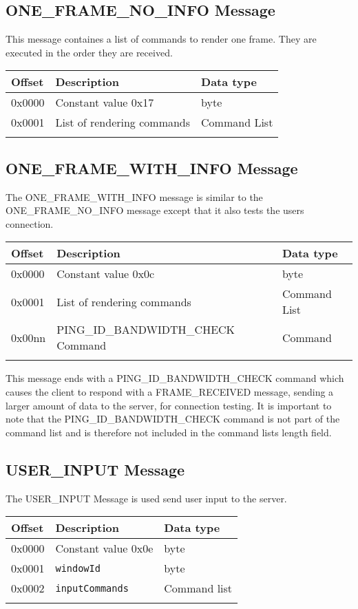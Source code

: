 \documentclass{article}
\newcommand{\field}[1]{\textcolor{fieldColor}{\texttt{#1}}}
\newenvironment{bytelisting}
{\ttfamily \begin{center} \begin{tabular}{l l l} Offset & Description & Data type \\ \hline}
{\normalfont \end{tabular} \end{center}}
\begin{document}
\subsection{ONE\_FRAME\_NO\_INFO Message}
This message containes a list of commands to render one frame. They are executed in the order they are received.

\begin{bytelisting}
0x0000 & Constant value 0x17 & byte \\
0x0001 & List of rendering commands & Command List \\
\end{bytelisting}

\subsection{ONE\_FRAME\_WITH\_INFO Message}
The ONE\_FRAME\_WITH\_INFO message is similar to the \\
ONE\_FRAME\_NO\_INFO message except that it also tests the users connection.

\begin{bytelisting}
0x0000 & Constant value 0x0c & byte \\
0x0001 & List of rendering commands & Command List \\
0x00nn & PING\_ID\_BANDWIDTH\_CHECK Command & Command \\
\end{bytelisting}

This message ends with a PING\_ID\_BANDWIDTH\_CHECK command which causes the client to respond with a FRAME\_RECEIVED message, sending a larger amount of data to the server, for connection testing.
It is important to note that the PING\_ID\_BANDWIDTH\_CHECK command is not part of the command list and is therefore not included in the command lists length field.

\subsection{USER\_INPUT Message}
The USER\_INPUT Message is used send user input to the server.

\begin{bytelisting}
0x0000 & Constant value 0x0e & byte \\
0x0001 & \field{windowId} & byte \\
0x0002 & \field{inputCommands} & Command list \\
\end{bytelisting}
\end{document}
